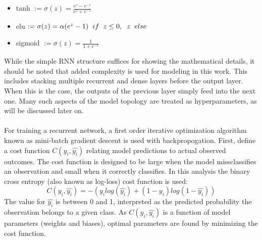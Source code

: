 \documentclass[11pt]{article}
\begin{document}
\begin{multicols*}{2}
                    \begin{itemize}
                        \item tanh $:= \sigma(z) = \frac{e^z - e^{-z}}{e^z + e^{-z}}$ 
                        \item elu $:= \sigma(z) = \alpha(e^z - 1) \hspace{0.2cm} if \hspace{0.2cm} z \le 0, \hspace{0.2cm} z \hspace{0.2cm} else$
                        \item sigmoid $:= \sigma(z) = \frac{1}{1 + e^{-z}}$
                    \end{itemize} 

                    While the simple RNN structure suffices for showing the mathematical details, it should be noted that added complexity is used for modeling in this work.
                    This includes stacking multiple recurrent and dense layers before the output layer. 
                    When this is the case, the outputs of the previous layer simply feed into the next one.
                    Many such aspects of the model topology are treated as hyperparameters, as will be discussed later on.
                
                \vspace{-10pt}

                \paragraph{}    
                    For training a recurrent network, a first order iterative optimization algorithm known as mini-batch gradient descent is used with backpropogation. 
                    First, define a cost function $C(y_i, \hat{y_i})$ relating model predictions to actual observed outcomes. 
                    The cost function is designed to be large when the model missclassifies an observation and small when it correctly classifies. 
                    In this analysis the binary cross entropy (also known as log-loss) cost function is used: $$C(y_i, \hat{y_i}) = -(y_i log(\hat{y_i}) + (1 - y_i)log(1 - \hat{y_i}))$$
                    The value for $\hat{y_i}$ is between 0 and 1, interpreted as the predicted probability the observation belongs to a given class.
                    As $C(y_i, \hat{y_i})$ is a function of model parameters (weights and biases), optimal parameters are found by minimizing the cost function.
                    

\end{multicols*}
\end{document}
